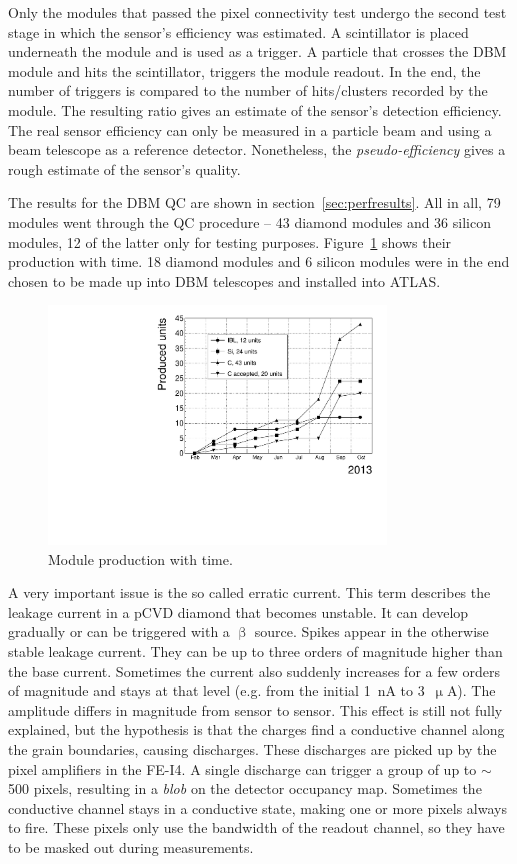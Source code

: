 Only the modules that passed the pixel connectivity test undergo the second test stage in which the sensor's efficiency was estimated. A scintillator is placed underneath the module and is used as a trigger. A particle that crosses the DBM module and hits the scintillator, triggers the module readout. In the end, the number of triggers is compared to the number of hits/clusters recorded by the module. The resulting ratio gives an estimate of the sensor's detection efficiency. The real sensor efficiency can only be measured in a particle beam and using a beam telescope as a reference detector. Nonetheless, the \emph{pseudo-efficiency} gives a rough estimate of the sensor's quality. 

The results for the DBM QC are shown in section~\ref{sec:perfresults}.  All in all, 79 modules went through the QC procedure -- 43 diamond modules and 36 silicon modules, 12 of the latter only for testing purposes. Figure~\ref{fig:production} shows their production with time. 18 diamond modules and 6 silicon modules were in the end chosen to be made up into DBM telescopes and installed into ATLAS.
\begin{figure}[!t]
\centering
\includegraphics[width=0.8\textwidth]{../scripts/04_charge_monitoring/plots/production}
\caption{Module production with time.}
\label{fig:production}
\end{figure}

A very important issue is the so called erratic current. This term describes the leakage current in a pCVD diamond that becomes unstable. It can develop gradually or can be triggered with a $\upbeta$ source. Spikes appear in the otherwise stable leakage current. They can be up to three orders of magnitude higher than the base current. Sometimes the current also suddenly increases for a few orders of magnitude and stays at that level (e.g. from the initial 1~nA to 3~$\upmu$A). The amplitude differs in magnitude from sensor to sensor. This effect is still not fully explained, but the hypothesis is that the charges find a conductive channel along the grain boundaries, causing discharges. These discharges are picked up by the pixel amplifiers in the FE-I4. A single discharge can trigger a group of up to $\sim$500 pixels, resulting in a \emph{blob} on the detector occupancy map. Sometimes the conductive channel stays in a conductive state, making one or more pixels always to fire. These pixels only use the bandwidth of the readout channel, so they have to be masked out during measurements. 


